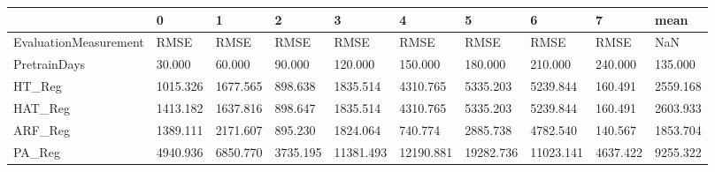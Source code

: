 \begin{tabular}{llllllllll}
\toprule
{} &        0 &        1 &        2 &         3 &         4 &         5 &         6 &        7 &     mean \\
\midrule
EvaluationMeasurement &     RMSE &     RMSE &     RMSE &      RMSE &      RMSE &      RMSE &      RMSE &     RMSE &      NaN \\
PretrainDays          &   30.000 &   60.000 &   90.000 &   120.000 &   150.000 &   180.000 &   210.000 &  240.000 &  135.000 \\
HT\_Reg                & 1015.326 & 1677.565 &  898.638 &  1835.514 &  4310.765 &  5335.203 &  5239.844 &  160.491 & 2559.168 \\
HAT\_Reg               & 1413.182 & 1637.816 &  898.647 &  1835.514 &  4310.765 &  5335.203 &  5239.844 &  160.491 & 2603.933 \\
ARF\_Reg               & 1389.111 & 2171.607 &  895.230 &  1824.064 &   740.774 &  2885.738 &  4782.540 &  140.567 & 1853.704 \\
PA\_Reg                & 4940.936 & 6850.770 & 3735.195 & 11381.493 & 12190.881 & 19282.736 & 11023.141 & 4637.422 & 9255.322 \\
\bottomrule
\end{tabular}
